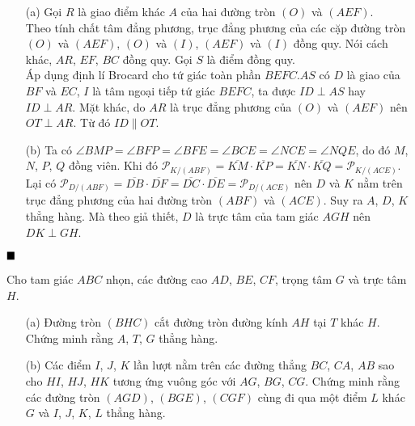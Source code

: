 \documentclass{article} %
\newenvironment{solution}[1][Lời giải]{%
  \proof[\faPenNib \hspace{0.2cm} \ttfamily \scshape \large #1]%
}{\(\hfill \blacksquare\){\parfillskip0pt\par}}
\begin{document}
        \begin{solution}
            \hfill
            \begin{enumerate}
                \item[(a)] Gọi \(R\) là giao điểm khác \(A\) của hai đường tròn \((O)\) và \((AEF)\).\\
                Theo tính chất tâm đẳng phương, trục đẳng phương của các cặp đường tròn \((O)\) và \((AEF)\), \((O)\) và \((I)\), \((AEF)\) và \((I)\) đồng quy. Nói cách khác, \(AR\), \(EF\), \(BC\) đồng quy. Gọi \(S\) là điểm đồng quy.\\
                Áp dụng định lí Brocard cho tứ giác toàn phần \(BEFC.AS\) có \(D\) là giao của \(BF\) và \(EC\), \(I\) là tâm ngoại tiếp tứ giác \(BEFC\), ta được \(ID \perp AS\) hay \(ID \perp AR\). Mặt khác, do \(AR\) là trục đẳng phương của \((O)\) và \((AEF)\) nên \(OT \perp AR\). Từ đó \(ID \parallel OT\).
                \item[(b)] Ta có \(\angle BMP = \angle BFP = \angle BFE = \angle BCE = \angle NCE = \angle NQE\), do đó \(M\), \(N\), \(P\), \(Q\) đồng viên. Khi đó \(\mathcal{P}_{K/(ABF)} = \overline{KM} \cdot \overline{KP} = \overline{KN} \cdot \overline{KQ} = \mathcal{P}_{K/(ACE)}\). Lại có \(\mathcal{P}_{D/(ABF)} = \overline{DB} \cdot \overline{DF} = \overline{DC} \cdot \overline{DE} = \mathcal{P}_{D/(ACE)}\) nên \(D\) và \(K\) nằm trên trục đẳng phương của hai đường tròn \((ABF)\) và \((ACE)\). Suy ra \(A\), \(D\), \(K\) thẳng hàng. Mà theo giả thiết, \(D\) là trực tâm của tam giác \(AGH\) nên \(DK \perp GH\).
            \end{enumerate}
        \end{solution}

        \begin{problem}
            Cho tam giác \(ABC\) nhọn, các đường cao \(AD\), \(BE\), \(CF\), trọng tâm \(G\) và trực tâm \(H\).
            \begin{enumerate}
                \item[(a)] Đường tròn \((BHC)\) cắt đường tròn đường kính \(AH\) tại \(T\) khác \(H\). Chứng minh rằng \(A\), \(T\), \(G\) thẳng hàng.
                \item[(b)] Các điểm \(I\), \(J\), \(K\) lần lượt nằm trên các đường thẳng \(BC\), \(CA\), \(AB\) sao cho \(HI\), \(HJ\), \(HK\) tương ứng vuông góc với \(AG\), \(BG\), \(CG\). Chứng minh rằng các đường tròn \((AGD)\), \((BGE)\), \((CGF)\) cùng đi qua một điểm \(L\) khác \(G\) và \(I\), \(J\), \(K\), \(L\) thẳng hàng.
            \end{enumerate}
        \end{problem}
\end{document}
